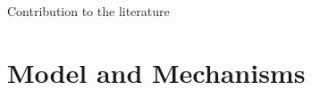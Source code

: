 \documentclass[11pt,aspectratio=169]{beamer}
\newcommand{\ar}{$\Rightarrow$ \ }
\begin{document}
\begin{frame}{Contribution to the literature}
\begin{itemize}[<+->]
	\end{itemize}
\end{frame}


\section{Model and Mechanisms}
\end{document}
